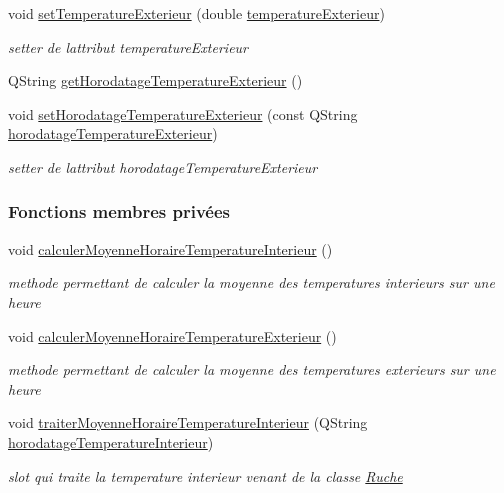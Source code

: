 \begin{DoxyCompactItemize}
void \hyperlink{class_infos_temperature_a40f22fbc27ed768e8269cdbf3df708c6}{set\+Temperature\+Exterieur} (double \hyperlink{class_infos_temperature_af80286a5b0e05d0379f53c0ebbc7d483}{temperature\+Exterieur})
\begin{DoxyCompactList}\small\item\em setter de l\textquotesingle{}attribut temperature\+Exterieur \end{DoxyCompactList}\item 
Q\+String \hyperlink{class_infos_temperature_a76b07dc0790718e134e306fe760e6cbf}{get\+Horodatage\+Temperature\+Exterieur} ()
\item 
void \hyperlink{class_infos_temperature_a85118414b65a715d07a92df3059c6fea}{set\+Horodatage\+Temperature\+Exterieur} (const Q\+String \hyperlink{class_infos_temperature_a5c3cd364746dc1cae5f9faee55c7555e}{horodatage\+Temperature\+Exterieur})
\begin{DoxyCompactList}\small\item\em setter de l\textquotesingle{}attribut horodatage\+Temperature\+Exterieur \end{DoxyCompactList}\end{DoxyCompactItemize}
\subsubsection*{Fonctions membres privées}
\begin{DoxyCompactItemize}
\item 
void \hyperlink{class_infos_temperature_a8cb8b9bef07506019ea6c9d91809af87}{calculer\+Moyenne\+Horaire\+Temperature\+Interieur} ()
\begin{DoxyCompactList}\small\item\em methode permettant de calculer la moyenne des temperatures interieurs sur une heure \end{DoxyCompactList}\item 
void \hyperlink{class_infos_temperature_a437325028225d765780b884614c47077}{calculer\+Moyenne\+Horaire\+Temperature\+Exterieur} ()
\begin{DoxyCompactList}\small\item\em methode permettant de calculer la moyenne des temperatures exterieurs sur une heure \end{DoxyCompactList}\item 
void \hyperlink{class_infos_temperature_a0311c8ce5730388f3baef752920d5abf}{traiter\+Moyenne\+Horaire\+Temperature\+Interieur} (Q\+String \hyperlink{class_infos_temperature_ad4c62d479b8897102a59025a56d7b4c6}{horodatage\+Temperature\+Interieur})
\begin{DoxyCompactList}\small\item\em slot qui traite la temperature interieur venant de la classe \hyperlink{class_ruche}{Ruche} \end{DoxyCompactList}\end{DoxyCompactItemize}
